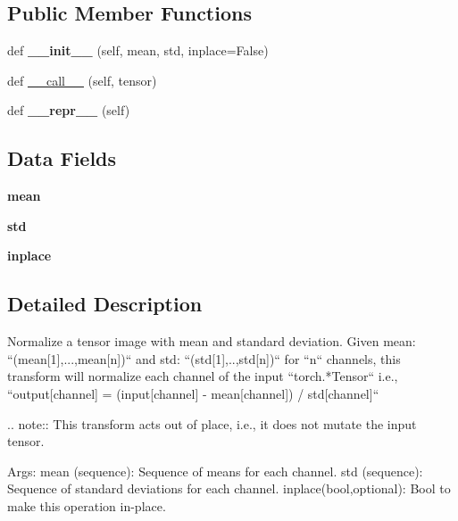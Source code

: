 \subsection*{Public Member Functions}
\begin{DoxyCompactItemize}
\item 
\mbox{\label{classtorchvision_1_1transforms_1_1transforms_1_1Normalize_a278ad260f1f75514b2dc6be9cc7b2114}} 
def {\bfseries \+\_\+\+\_\+init\+\_\+\+\_\+} (self, mean, std, inplace=False)
\item 
def \hyperlink{classtorchvision_1_1transforms_1_1transforms_1_1Normalize_a476404e1bf4cd9e7ce9cba23bea2c3ee}{\+\_\+\+\_\+call\+\_\+\+\_\+} (self, tensor)
\item 
\mbox{\label{classtorchvision_1_1transforms_1_1transforms_1_1Normalize_a8636b3e3269e6e00b18b85688530b310}} 
def {\bfseries \+\_\+\+\_\+repr\+\_\+\+\_\+} (self)
\end{DoxyCompactItemize}
\subsection*{Data Fields}
\begin{DoxyCompactItemize}
\item 
\mbox{\label{classtorchvision_1_1transforms_1_1transforms_1_1Normalize_a5db8375125bf7caec23126d789214c22}} 
{\bfseries mean}
\item 
\mbox{\label{classtorchvision_1_1transforms_1_1transforms_1_1Normalize_a0edc77eefdd0b47d414210e94d331ecc}} 
{\bfseries std}
\item 
\mbox{\label{classtorchvision_1_1transforms_1_1transforms_1_1Normalize_aca1d4f49cf280ca032364bfcd3663f42}} 
{\bfseries inplace}
\end{DoxyCompactItemize}


\subsection{Detailed Description}
\begin{DoxyVerb}Normalize a tensor image with mean and standard deviation.
Given mean: ``(mean[1],...,mean[n])`` and std: ``(std[1],..,std[n])`` for ``n``
channels, this transform will normalize each channel of the input
``torch.*Tensor`` i.e.,
``output[channel] = (input[channel] - mean[channel]) / std[channel]``

.. note::
    This transform acts out of place, i.e., it does not mutate the input tensor.

Args:
    mean (sequence): Sequence of means for each channel.
    std (sequence): Sequence of standard deviations for each channel.
    inplace(bool,optional): Bool to make this operation in-place.\end{DoxyVerb}
 

